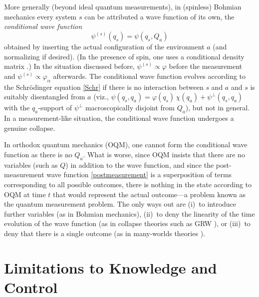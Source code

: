 \documentclass[12pt]{article}
\newcommand{\be}{\begin{equation}}
\newcommand{\ee}{\end{equation}}
\begin{document}
More generally (beyond ideal quantum measurements), in (spinless) Bohmian mechanics every system $s$ can be attributed a wave function of its own, the \emph{conditional wave function}
\be\label{psiconddef}
\psi^{(s)}(q_s) = \psi(q_s,Q_a)
\ee
obtained by inserting the actual configuration of the environment $a$ (and normalizing if desired). (In the presence of spin, one uses a conditional density matrix \cite{density}.) In the situation discussed before, $\psi^{(s)}\propto \varphi$ before the measurement and $\psi^{(s)}\propto \varphi_\alpha$ afterwards. The conditional wave function evolves according to the Schr\"odinger equation \eqref{Schr} if there is no interaction between $s$ and $a$ and $s$ is suitably disentangled from $a$ (viz., $\psi(q_s,q_a)=\varphi(q_s) \, \chi(q_a)+\psi^\perp(q_s,q_a)$ with the $q_a$-support of $\psi^{\perp}$ macroscopically disjoint from $Q_a$), but not in general. In a measurement-like situation, the conditional wave function undergoes a genuine collapse.

In orthodox quantum mechanics (OQM), one cannot form the conditional wave function as there is no $Q_a$. What is worse, since OQM insists that there are no variables (such as $Q$) in addition to the wave function, and since the post-measurement wave function \eqref{postmeasurement} is a superposition of terms corresponding to all possible outcomes, there is nothing in the state according to OQM at time $t$ that would represent the actual outcome---a problem known as the quantum measurement problem. The only ways out are (i)~to introduce further variables (as in Bohmian mechanics), (ii)~to deny the linearity of the time evolution of the wave function (as in collapse theories such as GRW \cite{Bell87,Lew}), or (iii)~to deny that there is a single outcome (as in many-worlds theories \cite{Sau,AGTZ11}).



\section{Limitations to Knowledge and Control}
\end{document}
